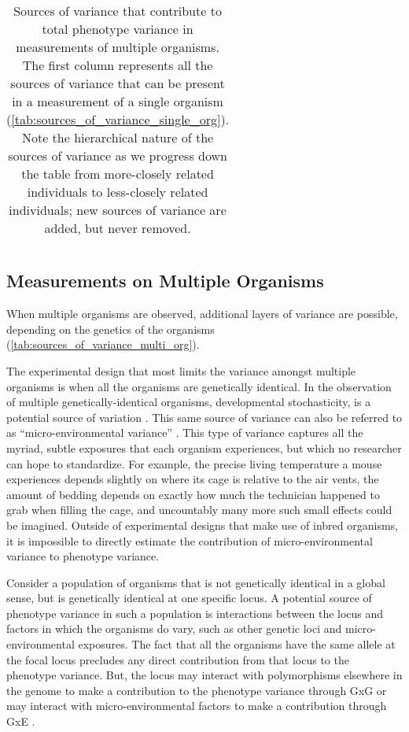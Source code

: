 \begin{sidewaystable}
\begin{tabular}{p{6cm}cccc}
	\cmidrule[0.1pt]{1-5}
	\end{tabular}
	\caption[
		Sources of variance in measurements of multiple organisms.
	]
	{
		Sources of variance that contribute to total phenotype variance in measurements of multiple organisms.
		The first column represents all the sources of variance that can be present in a measurement of a single organism (\autoref{tab:sources_of_variance_single_org}).
		Note the hierarchical nature of the sources of variance as we progress down the table from more-closely related individuals to less-closely related individuals; new sources of variance are added, but never removed.
	}
	\label{tab:sources_of_variance_multi_org}
\end{sidewaystable}


\subsection{Measurements on Multiple Organisms}

When multiple organisms are observed, additional layers of variance are possible, depending on the genetics of the organisms (\autoref{tab:sources_of_variance_multi_org}).

The experimental design that most limits the variance amongst multiple organisms is when all the organisms are genetically identical.
In the observation of multiple genetically-identical organisms, developmental stochasticity, is a potential source of variation \citep{Fraser2010}.
This same source of variance can also be referred to as ``micro-environmental variance'' \citep{Hill2010}.
This type of variance captures all the myriad, subtle exposures that each organism experiences, but which no researcher can hope to standardize.
For example, the precise living temperature a mouse experiences depends slightly on where its cage is relative to the air vents, the amount of bedding depends on exactly how much the technician happened to grab when filling the cage, and uncountably many more such small effects could be imagined.
Outside of experimental designs that make use of inbred organisms, it is impossible to directly estimate the contribution of micro-environmental variance to phenotype variance.

Consider a population of organisms that is not genetically identical in a global sense, but is genetically identical at one specific locus.
A potential source of phenotype variance in such a population is interactions between the locus and factors in which the organisms do vary, such as other genetic loci and micro-environmental exposures.
The fact that all the organisms have the same allele at the focal locus precludes any direct contribution from that locus to the phenotype variance.
But, the locus may interact with polymorphisms elsewhere in the genome to make a contribution to the phenotype variance through GxG or may interact with micro-environmental factors to make a contribution through GxE \citep{Falconer1995-od,Struchalin2010,Ronnegard2011a}.

